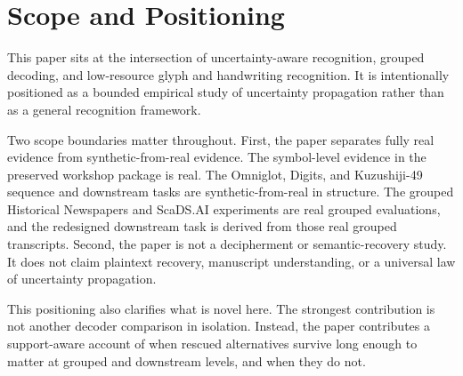 \section{Scope and Positioning}

This paper sits at the intersection of uncertainty-aware recognition, grouped decoding, and low-resource glyph and handwriting recognition. It is intentionally positioned as a bounded empirical study of uncertainty propagation rather than as a general recognition framework.

Two scope boundaries matter throughout. First, the paper separates fully real evidence from synthetic-from-real evidence. The symbol-level evidence in the preserved workshop package is real. The Omniglot, Digits, and Kuzushiji-49 sequence and downstream tasks are synthetic-from-real in structure. The grouped Historical Newspapers and ScaDS.AI experiments are real grouped evaluations, and the redesigned downstream task is derived from those real grouped transcripts. Second, the paper is not a decipherment or semantic-recovery study. It does not claim plaintext recovery, manuscript understanding, or a universal law of uncertainty propagation.

This positioning also clarifies what is novel here. The strongest contribution is not another decoder comparison in isolation. Instead, the paper contributes a support-aware account of when rescued alternatives survive long enough to matter at grouped and downstream levels, and when they do not.
